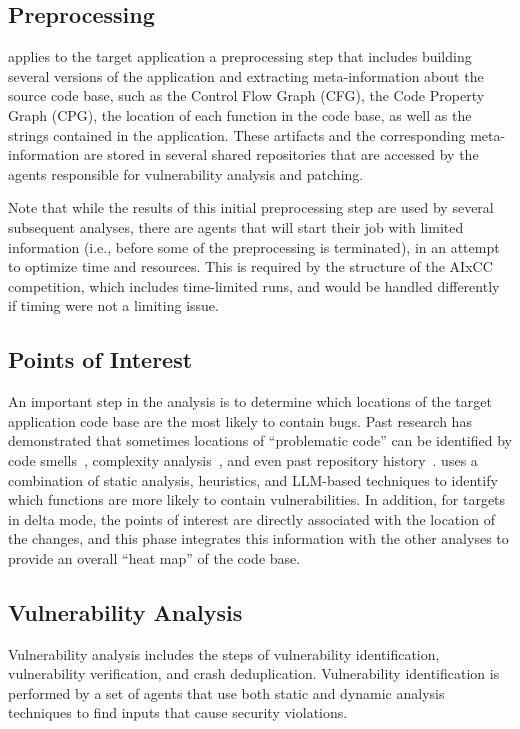 \subsection{Preprocessing}

\artiphishell applies to the target application a preprocessing step that includes building several versions of the application and extracting meta-information about the source code base, such as the Control Flow Graph (CFG), the Code Property Graph (CPG), the location of each function in the code base, as well as the strings contained in the application.
These artifacts and the corresponding meta-information are stored in several shared repositories that are accessed by the agents responsible for vulnerability analysis and patching.

Note that while the results of this initial preprocessing step are used by several subsequent analyses, there are agents that will start their job with limited information (i.e., before some of the preprocessing is terminated), in an attempt to optimize time and resources.
This is required by the structure of the AIxCC competition, which includes time-limited runs, and would be handled differently if timing were not a limiting issue.

\subsection{Points of Interest}

An important step in the analysis is to determine which locations of the target application code base are the most likely to contain bugs.
Past research has demonstrated that sometimes locations of ``problematic code'' can be identified by code smells~\cite{Neuhaus2007}, complexity analysis~\cite{Moshtari2013}, and even past repository history~\cite{meng2021:Bran}.
\artiphishell uses a combination of static analysis, heuristics, and LLM-based techniques to identify which functions are more likely to contain vulnerabilities.
In addition, for targets in delta mode, the points of interest are directly associated with the location of the changes, and this phase integrates this information with the other analyses to provide an overall ``heat map'' of the code base.

\subsection{Vulnerability Analysis}

Vulnerability analysis includes the steps of vulnerability identification, vulnerability verification, and crash deduplication.
Vulnerability identification is performed by a set of agents that use both static and dynamic analysis techniques to find inputs that cause security violations.

